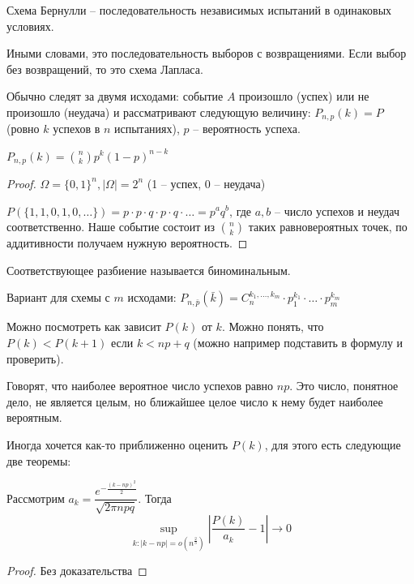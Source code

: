 \begin{Def}
Схема Бернулли -- последовательность независимых испытаний в одинаковых условиях.    
\end{Def}

\begin{Rem}
Иными словами, это последовательность выборов с возвращениями.
Если выбор без возвращений, то это схема Лапласа.
\end{Rem}

Обычно следят за двумя исходами: событие $A$ произошло (успех) или не произошло (неудача) и рассматривают следующую величину:
$P_{n,p}(k) = P$(ровно $k$ успехов в $n$ испытаниях), $p$ -- вероятность успеха.

\begin{theorem}
    $P_{n,p}(k) = {n \choose k} p^k (1-p)^{n-k}$
\end{theorem}
\begin{proof}
    $\Omega = \{0, 1\}^n, |\Omega| = 2^n$ (1 -- успех, 0 -- неудача)

    $P(\{1, 1, 0, 1, 0, \dots \}) = p \cdot p \cdot q \cdot p \cdot q \cdot \dots = p^{a}q^{b}$, где $a, b$ -- число успехов и неудач соответственно.
    Наше событие состоит из ${n \choose k}$ таких равновероятных точек, по аддитивности получаем нужную вероятность.
\end{proof}                                                                  

\begin{Def}
Соответствующее разбиение называется биноминальным.
\end{Def}

Вариант для схемы с $m$ исходами: $P_{n, \bar p}(\bar k) = C_n^{k_1, \dots, k_m} \cdot p_1^{k_1} \cdot \dots \cdot p_m^{k_m}$


Можно посмотреть как зависит $P(k)$ от $k$. Можно понять, что $P(k) < P(k + 1)$ если $k < np + q$ (можно например подставить в формулу и проверить).

Говорят, что наиболее вероятное число успехов равно $np$. Это число, понятное дело, не является целым, но ближайшее целое число к нему будет наиболее вероятным.

Иногда хочется как-то приближенно оценить $P(k)$, для этого есть следующие две теоремы:
\begin{theorem}
Рассмотрим $a_k = \dfrac{e^{-\frac{(k - np)^2}{2}}}{\sqrt{2\pi npq}}$. Тогда
$$\sup_{k\colon |k - np| = o(n^{\frac23})} |\frac{P(k)}{a_k} - 1| \to 0$$
\end{theorem}
\begin{proof}
Без доказательства
\end{proof}
